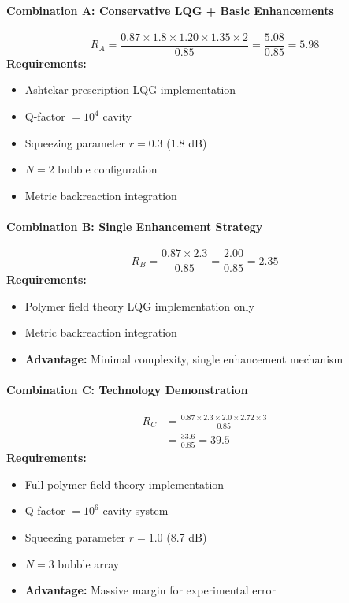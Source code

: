 \documentclass[11pt]{article}
\begin{document}
\paragraph{Combination A: Conservative LQG + Basic Enhancements}
\[
  R_A = \frac{0.87 \times 1.8 \times 1.20 \times 1.35 \times 2}{0.85} = \frac{5.08}{0.85} = 5.98
\]
\textbf{Requirements:}
\begin{itemize}
  \item Ashtekar prescription LQG implementation
  \item Q-factor $= 10^4$ cavity
  \item Squeezing parameter $r = 0.3$ (1.8 dB)
  \item $N = 2$ bubble configuration
  \item Metric backreaction integration
\end{itemize}

\paragraph{Combination B: Single Enhancement Strategy}
\[
  R_B = \frac{0.87 \times 2.3}{0.85} = \frac{2.00}{0.85} = 2.35
\]
\textbf{Requirements:}
\begin{itemize}
  \item Polymer field theory LQG implementation only
  \item Metric backreaction integration
  \item \textbf{Advantage:} Minimal complexity, single enhancement mechanism
\end{itemize}

\paragraph{Combination C: Technology Demonstration}
\begin{align*}
  R_C &= \frac{0.87 \times 2.3 \times 2.0 \times 2.72 \times 3}{0.85} \\
  &= \frac{33.6}{0.85} = 39.5
\end{align*}
\textbf{Requirements:}
\begin{itemize}
  \item Full polymer field theory implementation
  \item Q-factor $= 10^6$ cavity system
  \item Squeezing parameter $r = 1.0$ (8.7 dB)
  \item $N = 3$ bubble array
  \item \textbf{Advantage:} Massive margin for experimental error
\end{itemize}
\end{document}
